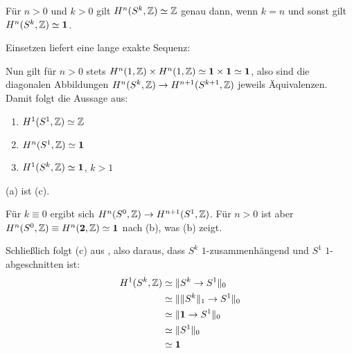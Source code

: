\begin{korollar}
  Für $n>0$ und $k>0$ gilt $H^n(S^k,\mathbb{Z})\simeq \mathbb{Z}$ genau dann, wenn $k=n$ und sonst gilt $H^n(S^k,\mathbb{Z})\simeq \mathbf{1}$.
\end{korollar}
\begin{beweis}[Idee]
  Einsetzen liefert eine lange exakte Sequenz:
  \begin{center}
  \end{center}
  Nun gilt für $n>0$ stets $H^n(1,\mathbb{Z})\times H^n(1,\mathbb{Z})\simeq \mathbf{1}\times\mathbf{1}\simeq \mathbf{1}$, also sind die diagonalen Abbildungen $H^n(S^k,\mathbb{Z})\to H^{n+1}(S^{k+1},\mathbb{Z})$ jeweils Äquivalenzen.
  Damit folgt die Aussage aus:
  \begin{enumerate}
  \item $H^1(S^1,\mathbb{Z})\simeq \mathbb{Z}$
  \item $H^n(S^1,\mathbb{Z})\simeq \mathbf{1}$
  \item $H^1(S^k,\mathbb{Z})\simeq \mathbf{1}$, $k>1$
  \end{enumerate}
  (a) ist  (c).

  Für $k\equiv 0$ ergibt sich $H^n(S^0,\mathbb{Z})\to H^{n+1}(S^{1},\mathbb{Z})$. Für $n>0$ ist aber $H^n(S^0,\mathbb{Z})\equiv H^n(\mathbf{2},\mathbb{Z})\simeq\mathbf{1}$ nach  (b), was (b) zeigt.

  Schließlich folgt (c) aus , also daraus, dass $S^{k}$ $1$-zusammenhängend und $S^1$ $1$-abgeschnitten ist:
  \begin{align*}
    H^1(S^k,\mathbb{Z})&\simeq\|S^k\to S^1\|_0 \\
               &\simeq \|\|S^k\|_1\to S^1  \|_0 \\
               &\simeq \|\mathbf{1}\to S^1\|_0\\
               &\simeq \|S^1\|_0\\
               &\simeq\mathbf{1}
  \end{align*}
\end{beweis}
